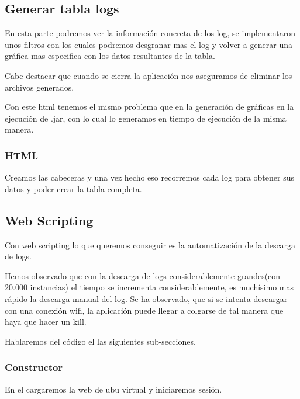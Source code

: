 \subsection{Generar tabla logs}\label{generar-tabla-log}
 
 En esta parte podremos ver la información concreta de los log, se implementaron unos filtros con los cuales podremos desgranar mas el log y volver a generar una gráfica mas especifica con los datos resultantes de la tabla.
 
 Cabe destacar que cuando se cierra la aplicación nos aseguramos de eliminar los archivos generados.
 
 Con este html tenemos el mismo problema que en la generación de gráficas en la ejecución de .jar, con lo cual lo generamos en tiempo de ejecución de la misma manera.
 
\subsubsection{HTML}\label{html-tabla-log}
 

Creamos las cabeceras y una vez hecho eso recorremos cada log para obtener sus datos y poder crear la tabla completa.

\subsection{Web Scripting}\label{web-scripting}

Con web scripting lo que queremos conseguir es la automatización de la descarga de logs.

Hemos observado que con la descarga de logs considerablemente grandes(con 20.000 instancias) el tiempo se incrementa considerablemente, es muchísimo mas rápido la descarga manual del log. Se ha observado, que si se intenta descargar con una conexión wifi, la aplicación puede llegar a colgarse de tal manera que haya que hacer un kill.

Hablaremos del código el las siguientes sub-secciones.

\subsubsection{Constructor}\label{constructor}

En el cargaremos la web de ubu virtual y iniciaremos sesión.

